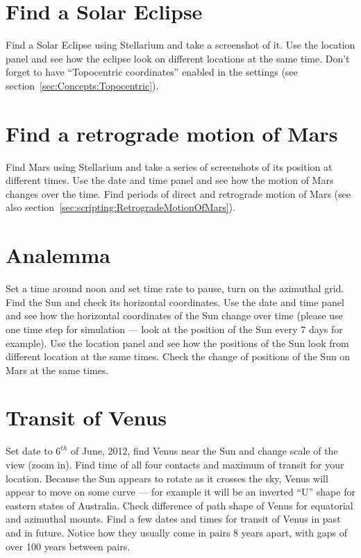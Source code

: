 \section{Find a Solar Eclipse}
\label{sec:Exercises:SolarEclipse}

Find a Solar Eclipse using Stellarium and take a screenshot of it. Use
the location panel and see how the eclipse look on different locations
at the same time. Don't forget to have ``Topocentric coordinates'' enabled 
in the settings (see section~\ref{sec:Concepts:Topocentric}).

\section{Find a retrograde motion of Mars}
\label{sec:Exercises:RetrogradeMotionOfMars}

Find Mars using Stellarium and take a series of screenshots of its 
position at different times. Use the date and time panel and see how 
the motion of Mars changes over the time. Find periods of direct 
and retrograde motion of Mars (see also section~\ref{sec:scripting:RetrogradeMotionOfMars}).

\section{Analemma}
\label{sec:Exercises:Analemma}

Set a time around noon and set time rate to pause, turn on the 
azimuthal grid. Find the Sun and check its horizontal coordinates. 
Use the date and time panel and see how the horizontal coordinates 
of the Sun change over time (please use one time step for 
simulation --- look at the position of the Sun every 7 days for 
example). Use the location panel and see how the positions of the 
Sun look from different location at the same times. Check the change 
of positions of the Sun on Mars at the same times.

\section{Transit of Venus}
\label{sec:Exercises:TransitOfVenus}

Set date to $6^{th}$ of June, 2012, find Venus near the Sun and change 
scale of the view (zoom in). Find time of all four contacts and maximum of 
transit for your location. Because the Sun appears to rotate as 
it crosses the sky, Venus will appear to move on some curve --- 
for example it will be an inverted ``U'' shape for eastern states 
of Australia. Check difference of path shape of Venus for 
equatorial and azimuthal mounts. Find a few dates and times for 
transit of Venus in past and in future. Notice how they usually 
come in pairs 8 years apart, with gaps of over 100 years between pairs.


